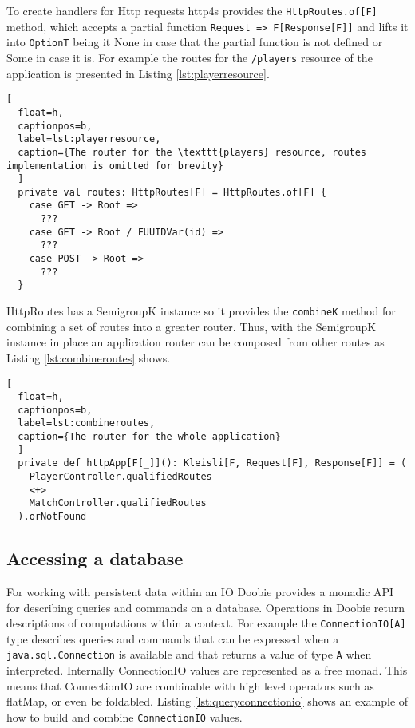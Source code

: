 \documentclass[../main.tex]{subfiles}
\begin{document}
To create handlers for Http requests http4s provides the \texttt{HttpRoutes.of[F]} method, which accepts a partial
function \texttt{Request => F[Response[F]]} and lifts it into \texttt{OptionT}
being it None in case that the partial function is not defined or Some in case
it is. For example the routes for the \texttt{/players} resource of the
application is presented in Listing \ref{lst:playerresource}.

\begin{lstlisting}[
  float=h,
  captionpos=b,
  label=lst:playerresource,
  caption={The router for the \texttt{players} resource, routes implementation is omitted for brevity}
  ]
  private val routes: HttpRoutes[F] = HttpRoutes.of[F] {
    case GET -> Root =>
      ???
    case GET -> Root / FUUIDVar(id) =>
      ???
    case POST -> Root =>
      ???
  }
\end{lstlisting}

HttpRoutes has a SemigroupK instance so it provides the \texttt{combineK} method
for combining a set of routes into a greater router. Thus, with the SemigroupK
instance in place an application router can be composed from other routes as Listing
\ref{lst:combineroutes} shows.

\begin{lstlisting}[
  float=h,
  captionpos=b,
  label=lst:combineroutes,
  caption={The router for the whole application}
  ]
  private def httpApp[F[_]](): Kleisli[F, Request[F], Response[F]] = (
    PlayerController.qualifiedRoutes
    <+>
    MatchController.qualifiedRoutes
  ).orNotFound
\end{lstlisting}

\subsection{Accessing a database}
For working with persistent data within an IO Doobie provides a monadic API for describing
queries and commands on a database. Operations in Doobie return descriptions of
computations within a context. For example the \texttt{ConnectionIO[A]} type
describes queries and commands that can be expressed when a
\texttt{java.sql.Connection} is available and that returns a value of type
\texttt{A} when interpreted. Internally ConnectionIO values are represented as a
free monad. This means that ConnectionIO are combinable with high level
operators such as flatMap, or even be foldabled. Listing \ref{lst:queryconnectionio} shows an
example of how to build and combine \texttt{ConnectionIO} values.
\end{document}

